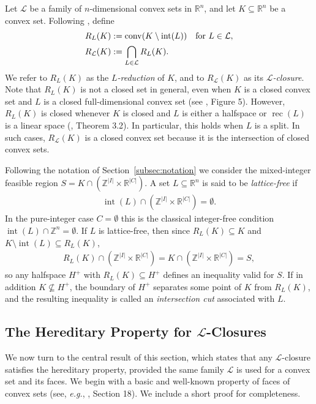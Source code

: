 \documentclass{article}
\newcommand{\Z}{\mathbb{Z}}
\newcommand{\R}{\mathbb{R}}
\renewcommand{\L}{\mathcal{L}}
\newcommand{\eg} {{\em e.g.\/}, }
\begin{document}
Let $\mathcal{L}$ be a family of $n$-dimensional convex sets in $\R^n$, and let $K \subseteq \R^n$ be a convex set. Following \cite{averkov2012finitely}, define
\begin{align}
    R_L(K) &:= \operatorname{conv}(K \setminus \operatorname{int}(L)) \quad \text{for } L \in \L, \notag \\
    R_\L(K) &:= \bigcap_{L \in \L} R_L(K). \notag 
\end{align}
We refer to $R_L(K)$ as the \emph{$L$-reduction} of $K$, and to $R_{\mathcal{L}}(K)$ as its \emph{$\L$-closure}. 
Note that $R_L(K)$ is not a closed set in general, even when $K$ is a closed convex set and $L$ is a closed full-dimensional convex set (see \cite{averkov2011finite}, Figure 5). However, $R_L(K)$ is closed whenever $K$ is closed and $L$ is either a halfspace or $\operatorname{rec}(L)$ is a linear space (\cite{averkov2011finite}, Theorem 3.2). In particular, this holds when $L$ is a split. In such cases, $R_\mathcal{L}(K)$ is a closed convex set because it is the intersection of closed convex sets.

Following the notation of Section~\ref{subsec:notation} we consider the mixed-integer feasible region   $S = K \cap (\Z^{|I|} \times \R^{|C|})$. A set $L \subseteq \R^n$ is said to be \emph{lattice-free} if
\begin{align}
    \operatorname{int}(L) \cap (\Z^{|I|} \times \R^{|C|}) = \emptyset.
\end{align}
In the pure-integer case $C = \emptyset$ this is the classical integer-free condition $\operatorname{int}(L) \cap \Z^n = \emptyset$. If $L$ is lattice-free, then since $R_L(K) \subseteq K$ and $K \setminus \operatorname{int}(L) \subseteq R_L(K)$,
\begin{align}
    R_L(K) \cap (\Z^{|I|} \times \R^{|C|}) = K \cap (\Z^{|I|} \times \R^{|C|}) = S,
\end{align}
so any halfspace $H^+$ with $R_L(K) \subseteq H^+$ defines an inequality valid for $S$. If in addition $K \nsubseteq H^+$, the boundary of $H^+$ separates some point of $K$ from $R_L(K)$, and the resulting inequality is called an \emph{intersection cut} associated with $L$.

\subsection{The Hereditary Property for \texorpdfstring{$\L$}{L}-Closures} \label{subsec:L-closure-hered}

We now turn to the central result of this section, which states that any $\L$-closure satisfies the hereditary property, provided the same family $\L$ is used for a convex set and its faces. We begin with a basic and well-known property of faces of convex sets (see, \eg \cite{rockafellar1970convex}, Section 18). We include a short proof for completeness.
\end{document}
